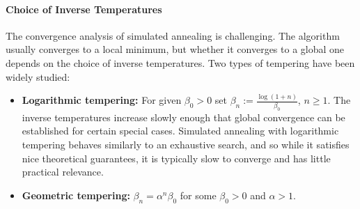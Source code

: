\paragraph{Choice of Inverse Temperatures}
The convergence analysis of simulated annealing is challenging. The algorithm usually converges
to a local minimum, but whether it converges to a global one depends on the choice of inverse
temperatures. Two types of tempering have been widely studied:

\begin{itemize}
\item \textbf{Logarithmic tempering:} For given $\beta_0 > 0$ set
  $\beta_n := \frac{\log(1+n)}{\beta_0}$, $n \geq 1$. The inverse temperatures increase slowly
  enough that global convergence can be established for certain special cases. Simulated
  annealing with logarithmic tempering behaves similarly to an exhaustive search, and so while
  it satisfies nice theoretical guarantees, it is typically slow to converge and has little
  practical relevance.

\item \textbf{Geometric tempering:} $\beta_n = \alpha^n \beta_0$ for some $\beta_0 > 0$ and
  $\alpha > 1$.
\end{itemize}

\begin{center}
\end{center}
